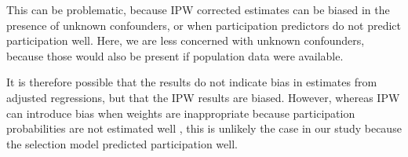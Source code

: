 This can be problematic, because IPW corrected estimates can be biased in the presence of unknown confounders, or when participation predictors do not predict participation well. Here, we are less concerned with unknown confounders, because those would also be present if population data were available.   

It is therefore possible that the results do not indicate bias in estimates from adjusted regressions, but that the IPW results are biased. However, whereas IPW can introduce bias when weights are inappropriate because participation probabilities are not estimated well \supercite{Seaman2013-rj}, this is unlikely the case in our study because the selection model predicted participation well.
